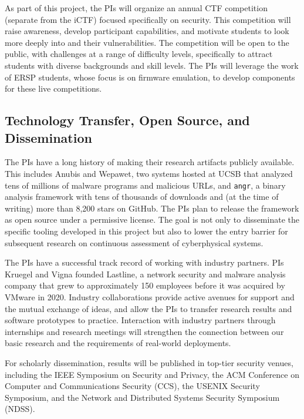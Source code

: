 As part of this project, the PIs will organize an annual CTF
competition (separate from the iCTF) focused specifically on \cps
security. This competition will raise awareness, develop participant
capabilities, and motivate students to look more deeply into \CPSs
and their vulnerabilities. The competition will be open to the public,
with challenges at a range of difficulty levels, specifically to
attract students with diverse backgrounds and skill levels. The PIs
will leverage the work of ERSP students, whose focus is on firmware
emulation, to develop \cps components for these live competitions.

\subsection{Technology Transfer, Open Source, and Dissemination}

The PIs have a long history of making their research artifacts publicly
available. This includes Anubis and Wepawet, two systems hosted at
UCSB that analyzed tens of millions of malware programs and malicious
URLs, and \texttt{angr}, a binary analysis framework with tens of
thousands of downloads and (at the time of writing) more than 8{,}200
stars on GitHub. The PIs plan to release the \sysname framework as
open source under a permissive license. The goal is not only to
disseminate the specific tooling developed in this project but also to
lower the entry barrier for subsequent research on continuous
assessment of cyberphysical systems.

The PIs have a successful track record of working with industry
partners. PIs Kruegel and Vigna founded Lastline, a network security
and malware analysis company that grew to approximately 150 employees
before it was acquired by VMware in 2020. Industry collaborations
provide active avenues for support and the mutual exchange of ideas,
and allow the PIs to transfer research results and software prototypes
to practice. Interaction with industry partners through internships
and research meetings will strengthen the connection between our
basic research and the requirements of real-world deployments.

For scholarly dissemination, results will be published in top-tier
security venues, including the IEEE Symposium on Security and Privacy,
the ACM Conference on Computer and Communications Security (CCS), the
USENIX Security Symposium, and the Network and Distributed Systems
Security Symposium (NDSS).
